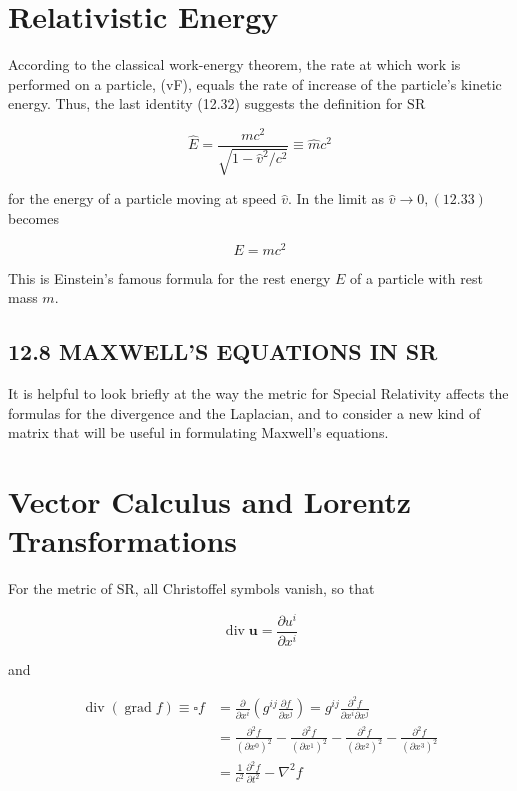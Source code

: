\documentclass[10pt]{article}
\begin{document}
\section*{Relativistic Energy}
According to the classical work-energy theorem, the rate at which work is performed on a particle, (vF), equals the rate of increase of the particle's kinetic energy. Thus, the last identity (12.32) suggests the definition for $\mathrm{SR}$


\begin{equation*}
\hat{E}=\frac{m c^{2}}{\sqrt{1-\hat{v}^{2} / c^{2}}} \equiv \hat{m} c^{2} \tag{12.33}
\end{equation*}


for the energy of a particle moving at speed $\hat{v}$. In the limit as $\hat{v} \rightarrow 0,(12.33)$ becomes


\begin{equation*}
E=m c^{2} \tag{12.34}
\end{equation*}


This is Einstein's famous formula for the rest energy $E$ of a particle with rest mass $m$.

\subsection*{12.8 MAXWELL'S EQUATIONS IN SR}
It is helpful to look briefly at the way the metric for Special Relativity affects the formulas for the divergence and the Laplacian, and to consider a new kind of matrix that will be useful in formulating Maxwell's equations.

\section*{Vector Calculus and Lorentz Transformations}
For the metric of SR, all Christoffel symbols vanish, so that


\begin{equation*}
\operatorname{div} \mathbf{u}=\frac{\partial u^{i}}{\partial x^{i}} \tag{12.35}
\end{equation*}


and


\begin{align*}
\operatorname{div}(\operatorname{grad} f) \equiv \square f & =\frac{\partial}{\partial x^{i}}\left(g^{i j} \frac{\partial f}{\partial x^{j}}\right)=g^{i j} \frac{\partial^{2} f}{\partial x^{i} \partial x^{j}} \\
& =\frac{\partial^{2} f}{\left(\partial x^{0}\right)^{2}}-\frac{\partial^{2} f}{\left(\partial x^{1}\right)^{2}}-\frac{\partial^{2} f}{\left(\partial x^{2}\right)^{2}}-\frac{\partial^{2} f}{\left(\partial x^{3}\right)^{2}} \\
& =\frac{1}{c^{2}} \frac{\partial^{2} f}{\partial t^{2}}-\nabla^{2} f \tag{12.36}
\end{align*}
\end{document}
